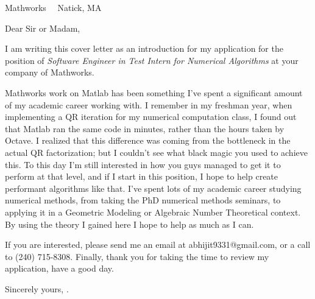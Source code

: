 \documentclass{scrlttr2}
\renewcommand{\\}{\ {\large\textperiodcentered}\ }
\begin{document}

\begin{letter}{ %
Mathworks\\
Natick, MA\\
}

\opening{Dear Sir or Madam,}

I am writing this cover letter as an introduction for my application for the
position of \textit{Software Engineer in Test Intern for Numerical Algorithms}
at your company of Mathworks.

Mathworks work on Matlab has been something I've spent a significant amount of
my academic career working with. I remember in my freshman year, when
implementing a QR iteration for my numerical computation class, I found out that
Matlab ran the same code in minutes, rather than the hours taken by Octave. I
realized that this difference was coming from the bottleneck in the actual QR
factorization; but I couldn't see what black magic you used to achieve this. To
this day I'm still interested in how you guys managed to get it to perform at
that level, and if I start in this position, I hope to help create performant
algorithms like that. I've spent lots of my academic career studying numerical
methods, from taking the PhD numerical methods seminars, to applying it in a
Geometric Modeling or Algebraic Number Theoretical context. By using the theory
I gained here I hope to help as much as I can. 

If you are interested, please send me an email at abhijit9331@gmail.com, or a
call to (240) 715-8308. Finally, thank you for taking the time to review my
application, have a good day. \\

Sincerely yours, 
.


\end{letter}
\end{document}
